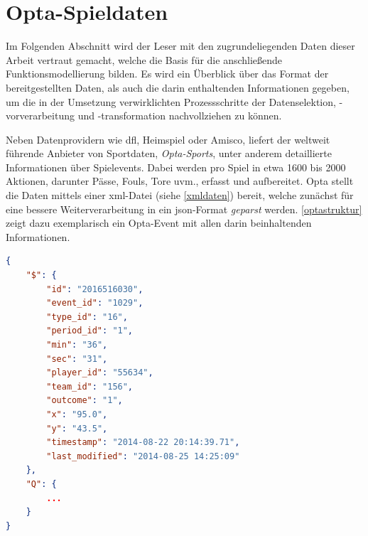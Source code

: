 \section{Opta-Spieldaten}

Im Folgenden Abschnitt wird der Leser mit den zugrundeliegenden Daten dieser Arbeit vertraut gemacht, welche die Basis für die anschließende Funktionsmodellierung bilden. Es wird ein Überblick über das Format der bereitgestellten Daten, als auch die darin enthaltenden Informationen gegeben, um die in der Umsetzung verwirklichten Prozessschritte der Datenselektion, -vorverarbeitung und -transformation nachvollziehen zu können.

Neben Datenprovidern wie \gls{dfl}, Heimspiel oder Amisco, liefert der weltweit führende Anbieter von Sportdaten, \textit{Opta-Sports}, unter anderem detaillierte Informationen über Spielevents. Dabei werden pro Spiel in etwa 1600 bis 2000 Aktionen, darunter Pässe, Fouls, Tore uvm., erfasst und aufbereitet. Opta stellt die Daten mittels einer \gls{xml}-Datei (siehe \vref{xmldaten}) bereit, welche zunächst für eine bessere Weiterverarbeitung in ein \gls{json}-Format \textit{geparst} werden. \vref{optastruktur} zeigt dazu exemplarisch ein Opta-Event mit allen darin beinhaltenden Informationen.
\newline

\begin{lstlisting}[caption=\captionListingText,language=json,xleftmargin=5mm,label=optastruktur] 
{
	"$": {
		"id": "2016516030",
		"event_id": "1029",
		"type_id": "16",
		"period_id": "1",
		"min": "36",
		"sec": "31",
		"player_id": "55634",
		"team_id": "156",
		"outcome": "1",
		"x": "95.0",
		"y": "43.5",
		"timestamp": "2014-08-22 20:14:39.71",
		"last_modified": "2014-08-25 14:25:09"
	},
	"Q": {
	    ...
	}
}
\end{lstlisting}


